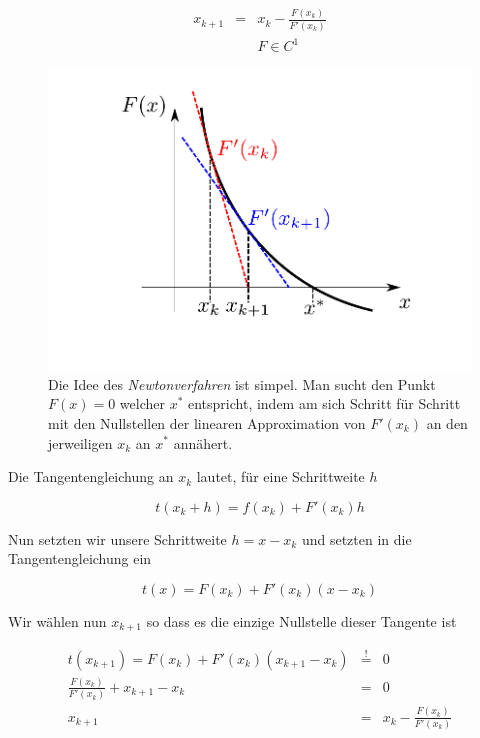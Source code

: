 \documentclass[10pt,a4paper]{article}
\begin{document}
\begin{defi}

\begin{eqnarray*}
x_{k+1} &=& x_k - \frac{F(x_k)}{F'(x_k)} \\
&& F \in C^{1} 
\end{eqnarray*}

\begin{figure}[H]

\includegraphics[width=\textwidth]{images/newton_verfahren}
\caption{Die Idee des \emph{Newtonverfahren} ist simpel. Man sucht den Punkt $F(x)=0$ welcher $x^{*}$ entspricht, indem am sich Schritt für Schritt mit den Nullstellen der linearen Approximation von $F'(x_k)$ an den jerweiligen $x_k$ an $x^{*}$ annähert. }
\label{fig:newtonverfahren}
\end{figure}

\end{defi}

\begin{bsp}
Die Tangentengleichung an $x_k$ lautet, für eine Schrittweite $h$

$$t(x_k+h)=f(x_k)+F'(x_k)h$$

Nun setzten wir unsere Schrittweite $h=x-x_k$ und setzten in die Tangentengleichung ein

$$t(x)=F(x_k)+F'(x_k)(x-x_k)$$

Wir wählen nun $x_{k+1}$ so dass es die einzige Nullstelle dieser Tangente ist

\begin{eqnarray*}
t(x_{k+1})=F(x_k)+F'(x_k)(x_{k+1}-x_k) &\stackrel{!}{=}& 0 \\
\frac{F(x_k)}{F'(x_k)} + x_{k+1}-x_k &=& 0 \\
x_{k+1}  &=&  x_k -\frac{F(x_k)}{F'(x_k)}
\end{eqnarray*}

\end{bsp}
\end{document}
